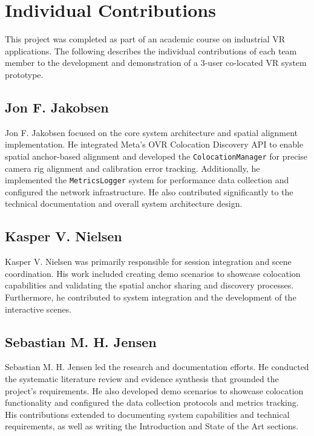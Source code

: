 \documentclass[conference]{IEEEtran}
\begin{document}




\section*{Individual Contributions}

This project was completed as part of an academic course on industrial VR applications. The following describes the individual contributions of each team member to the development and demonstration of a 3-user co-located VR system prototype.

\subsection*{Jon F. Jakobsen}
Jon F. Jakobsen focused on the core system architecture and spatial alignment implementation. He integrated Meta's OVR Colocation Discovery API to enable spatial anchor-based alignment and developed the \texttt{ColocationManager} for precise camera rig alignment and calibration error tracking. Additionally, he implemented the \texttt{MetricsLogger} system for performance data collection and configured the network infrastructure. He also contributed significantly to the technical documentation and overall system architecture design.

\subsection*{Kasper V. Nielsen}
Kasper V. Nielsen was primarily responsible for session integration and scene coordination. His work included creating demo scenarios to showcase colocation capabilities and validating the spatial anchor sharing and discovery processes. Furthermore, he contributed to system integration and the development of the interactive scenes.

\subsection*{Sebastian M. H. Jensen}
Sebastian M. H. Jensen led the research and documentation efforts. He conducted the systematic literature review and evidence synthesis that grounded the project's requirements. He also developed demo scenarios to showcase colocation functionality and configured the data collection protocols and metrics tracking. His contributions extended to documenting system capabilities and technical requirements, as well as writing the Introduction and State of the Art sections.
\end{document}
